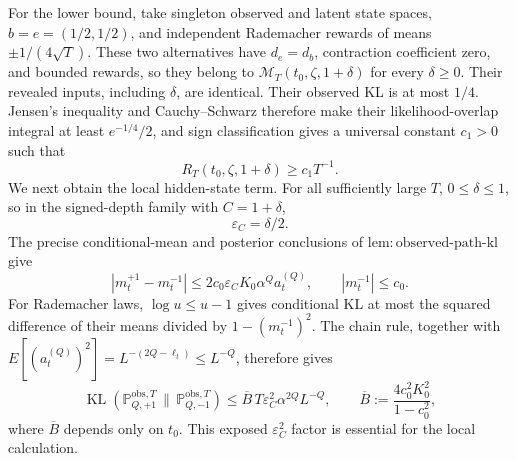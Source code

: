 For the lower bound, take singleton observed and latent state spaces, \(b=e=(1/2,1/2)\), and independent Rademacher rewards of means \(\pm1/(4\sqrt T)\).  These two alternatives have \(d_e=d_b\), contraction coefficient zero, and bounded rewards, so they belong to \(\mathcal M_T(t_0,\zeta,1+\delta)\) for every \(\delta\ge0\).  Their revealed inputs, including \(\delta\), are identical.  Their observed KL is at most \(1/4\).  Jensen's inequality and Cauchy--Schwarz therefore make their likelihood-overlap integral at least \(e^{-1/4}/2\), and sign classification gives a universal constant \(c_1>0\) such that
\[
 R_T(t_0,\zeta,1+\delta)\ge c_1T^{-1}. \tag{38}
\]
We next obtain the local hidden-state term.  For all sufficiently large \(T\), \(0\le\delta\le1\), so in the signed-depth family with \(C=1+\delta\),
\[
 \varepsilon_C=\delta/2. \tag{39}
\]
The precise conditional-mean and posterior conclusions of \(\mathrm{lem{:}observed\text{-}path\text{-}kl}\) give
\[
 |m_t^{+1}-m_t^{-1}|
 \le2c_0\varepsilon_CK_0\alpha^Qa_t^{(Q)},
 \qquad |m_t^{-1}|\le c_0.
\]
For Rademacher laws, \(\log u\le u-1\) gives conditional KL at most the squared difference of their means divided by \(1-(m_t^{-1})^2\).  The chain rule, together with
\(E[(a_t^{(Q)})^2]=L^{-(2Q-\ell_t)}\le L^{-Q}\), therefore gives
\[
 \operatorname{KL}(\mathbb P_{Q,+1}^{\mathrm{obs},T}\,\|\,
                    \mathbb P_{Q,-1}^{\mathrm{obs},T})
 \le \overline B\,T\varepsilon_C^2\alpha^{2Q}L^{-Q},
 \qquad
 \overline B:=\frac{4c_0^2K_0^2}{1-c_0^2}, \tag{40}
\]
where \(\overline B\) depends only on \(t_0\).  This exposed \(\varepsilon_C^2\) factor is essential for the local calculation.

